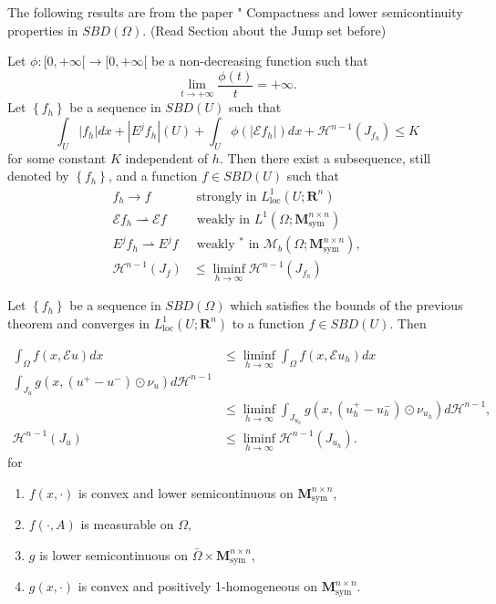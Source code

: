 The following results are from the paper " Compactness and lower semicontinuity properties in $SBD(\Omega)$. (Read Section about the Jump set before)
\begin{theorem}
Let $\phi:[0,+\infty[\rightarrow[0,+\infty[$ be a non-decreasing function such that
$$
\lim _{t \rightarrow+\infty} \frac{\phi(t)}{t}=+\infty .
$$
Let $\left\{f_h\right\}$ be a sequence in $S B D(U)$ such that
$$\int_{U}\left|f_h\right| d x+\left|E^j f_h\right|(U)+\int_{U} \phi\left(\left|\mathcal{E} f_h\right|\right) d x+\mathcal{H}^{n-1}\left(J_{f_h}\right) \leq K$$
for some constant $K$ independent of $h$. Then there exist a subsequence, still denoted by $\left\{f_h\right\}$, and a function $f \in S B D(U)$ such that
\begin{align*}
f_h \rightarrow f & \text { strongly in } L_{\mathrm{loc}}^1\left(U ; \mathbf{R}^n\right) \\
\mathcal{E} f_h \rightharpoonup \mathcal{E} f & \text { weakly in } L^1\left(\Omega ; \mathbf{M}_{\mathrm{sym}}^{n \times n}\right) \\
E^j f_h \rightharpoonup E^j f & \text { weakly }{ }^* \text { in } \mathcal{M}_b\left(\Omega ; \mathbf{M}_{\mathrm{sym}}^{n \times n}\right), \\
\mathcal{H}^{n-1}\left(J_f\right) &\leq \liminf _{h \rightarrow \infty} \mathcal{H}^{n-1}\left(J_{f_h}\right)
\end{align*}
\end{theorem}


\begin{corollary}
Let $\left\{f_h\right\}$ be a sequence in $S B D(\Omega)$ which satisfies the bounds of the previous theorem and converges in $L_{\mathrm{loc}}^1\left(U ; \mathbf{R}^n\right)$ to a function $f \in S B D(U)$. Then

\begin{align*}
\int_{\Omega} f(x, \mathcal{E} u) d x & \leq \liminf _{h \rightarrow \infty} \int_{\Omega} f\left(x, \mathcal{E} u_h\right) d x \\
\int_{J_u} g\left(x,\left(u^{+}-u^{-}\right) \odot \nu_u\right) d \mathcal{H}^{n-1} \\
& \leq \liminf _{h \rightarrow \infty} \int_{J_{u_h}} g\left(x,\left(u_h^{+}-u_h^{-}\right) \odot \nu_{u_h}\right) d \mathcal{H}^{n-1}, \\
\mathcal{H}^{n-1}\left(J_u\right) & \leq \liminf _{h \rightarrow \infty} \mathcal{H}^{n-1}\left(J_{u_h}\right) .
\end{align*}
for 
\begin{enumerate}
    \item $f(x, \cdot)$ is convex and lower semicontinuous on $\mathbf{M}_{\mathrm{sym}}^{n \times n}$, 
    \item $f(\cdot, A)$ is measurable on $\Omega$,
    \item $g$ is lower semicontinuous on $\bar{\Omega} \times \mathbf{M}_{\mathrm{sym}}^{n \times n}$,
    \item $g(x, \cdot)$ is convex and positively 1-homogeneous on $\mathbf{M}_{\mathrm{sym}}^{n \times n}$.
\end{enumerate}
\end{corollary}

